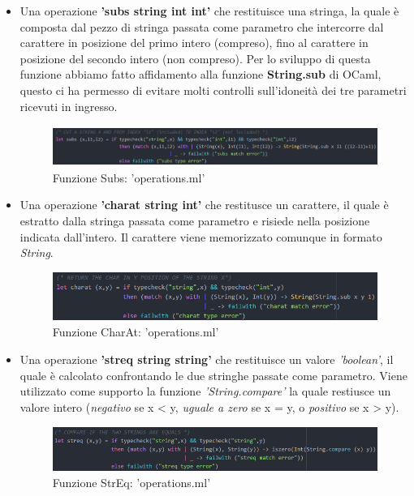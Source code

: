 \documentclass[a4paper,titlepage]{book}
\begin{document}
\begin{itemize}
\item Una operazione \textbf{'subs string int int'} che restituisce una stringa, la quale \`e composta dal pezzo di stringa passata come parametro che intercorre dal carattere in posizione del primo intero (compreso), fino al carattere in posizione del secondo intero (non compreso).
Per lo sviluppo di questa funzione abbiamo fatto affidamento alla funzione \textbf{String.sub} di OCaml, questo ci ha permesso di evitare molti controlli sull'idoneit\`a dei tre parametri ricevuti in ingresso.

\begin{figure}[H]
\center
\includegraphics[height=50px]{img/subs.png}
\caption{Funzione Subs: 'operations.ml' \label{fig:subs}}
\end{figure}
\clearpage

\item Una operazione \textbf{'charat string int'} che restitusce un carattere, il quale \`e estratto dalla stringa passata come parametro e risiede nella posizione indicata dall'intero. Il carattere viene memorizzato comunque in formato \textit{String}.

\begin{figure}[H]
\center
\includegraphics[height=60px]{img/charat.png}
\caption{Funzione CharAt: 'operations.ml' \label{fig:charat}}
\end{figure}

\item Una operazione \textbf{'streq string string'} che restituisce un valore \textit{'boolean'}, il quale \`e calcolato confrontando le due stringhe passate come parametro. Viene utilizzato come supporto la funzione \textit{'String.compare'} la quale restiusce un valore intero (\textit{negativo} se x < y, \textit{uguale a zero} se x = y, o \textit{positivo} se x > y).

\begin{figure}[H]
\center
\includegraphics[height=55px]{img/streq.png}
\caption{Funzione StrEq: 'operations.ml' \label{fig:streq}}
\end{figure}
\end{itemize}
\clearpage
\end{document}
